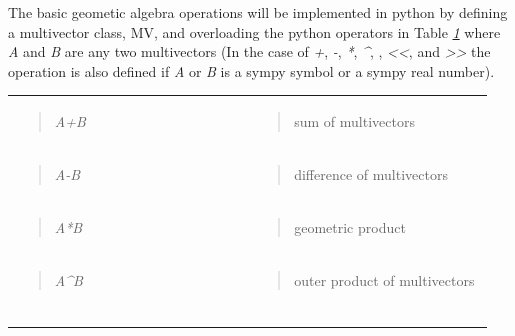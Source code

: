 \documentclass[letterpaper,10pt,english]{sphinxmanual}
\begin{document}
The basic geometic algebra operations will be implemented in python by defining
a multivector class, MV, and overloading the python operators in Table
{\hyperref[GA:table1]{\emph{1}}} where \emph{A} and \emph{B}  are any two multivectors (In the case of
\emph{+}, \emph{-}, \emph{*}, \emph{\textasciicircum{}}, \emph{\textbar{}}, \emph{\textless{}\textless{}}, and \emph{\textgreater{}\textgreater{}} the operation is also defined if \emph{A} or
\emph{B} is a sympy symbol or a sympy real number).
\label{GA:table1}
\begin{tabular}{|p{0.475\linewidth}|p{0.475\linewidth}|}
\hline
\textbf{\begin{quote}

Operation
\end{quote}
} & \textbf{\begin{quote}

Result
\end{quote}
}\\\hline
\begin{quote}

\emph{A+B}
\end{quote}
 & \begin{quote}

sum of multivectors
\end{quote}
\\\hline
\begin{quote}

\emph{A-B}
\end{quote}
 & \begin{quote}

difference of multivectors
\end{quote}
\\\hline
\begin{quote}

\emph{A*B}
\end{quote}
 & \begin{quote}

geometric product
\end{quote}
\\\hline
\begin{quote}

\emph{A\textasciicircum{}B}
\end{quote}
 & \begin{quote}

outer product of multivectors
\end{quote}
\\\hline
\begin{quote}


\end{quote}
\end{tabular}
\end{document}
